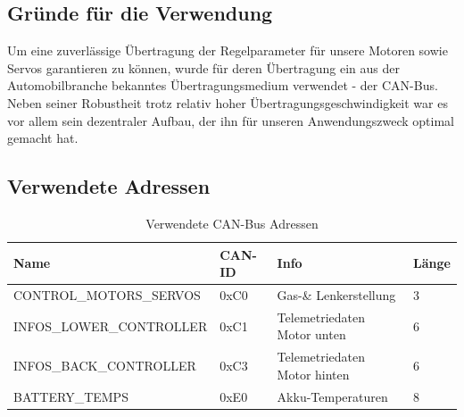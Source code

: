 \subsection{Gründe für die Verwendung}
Um eine zuverlässige Übertragung der Regelparameter für unsere Motoren sowie Servos garantieren zu können, wurde für deren Übertragung ein aus der Automobilbranche bekanntes Übertragungsmedium verwendet - der CAN-Bus. 
Neben seiner Robustheit trotz relativ hoher Übertragungsgeschwindigkeit war es vor allem sein dezentraler Aufbau, der ihn für unseren Anwendungszweck optimal gemacht hat.

\newpage

\subsection{Verwendete Adressen}
\begin{table}[h]
    \begin{tabular}{|l|l|l|l|}
        \hline
    Name                              & CAN-ID & Info         & Länge \\\hline
    CONTROL\_MOTORS\_SERVOS  & 0xC0   & Gas-\& Lenkerstellung & 3     \\
    INFOS\_LOWER\_CONTROLLER & 0xC1   & Telemetriedaten Motor unten  & 6     \\
    INFOS\_BACK\_CONTROLLER  & 0xC3   & Telemetriedaten Motor hinten & 6     \\
    BATTERY\_TEMPS           & 0xE0   & Akku-Temperaturen            & 8    \\\hline
    \end{tabular}
    \caption{Verwendete CAN-Bus Adressen}
\end{table}
